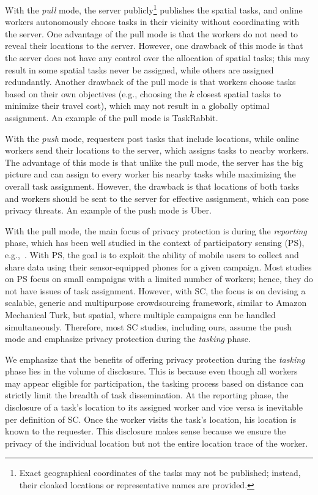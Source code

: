 \documentclass{USC-Thesis}
\numberwithin{equation}{chapter}
\begin{document}
With the \emph{pull} mode, the server publicly\footnote{Exact geographical coordinates of the tasks may not be published; instead, their cloaked locations or representative names are provided.} publishes the spatial tasks, and online workers autonomously choose tasks in their vicinity without coordinating with the server. One advantage of the pull mode is that the workers do not need to reveal their locations to the server. However, one drawback of this mode is that the server does not have any control over the allocation of spatial tasks; this may result in some spatial tasks never be assigned, while others are assigned redundantly. Another drawback of the pull mode is that workers choose tasks based on their own objectives (e.g., choosing the $k$ closest spatial tasks to minimize their travel cost), which may not result in a globally optimal assignment. An example of the pull mode is TaskRabbit.

With the \emph{push} mode, requesters post tasks that include locations, while online workers send their locations to the server, which assigns tasks to nearby workers. The advantage of this mode is that unlike the pull mode, the server has the big picture and can assign to every worker his nearby tasks while maximizing the overall task assignment. However, the drawback is that locations of both tasks and workers should be sent to the server for effective assignment, which can pose privacy threats. An example of the push mode is Uber.

With the pull mode, the main focus of privacy protection is during the \emph{reporting} phase, which has been well studied in the context of participatory sensing (PS), e.g.,~\cite{Shin2011,kazemi2011privacy,Vu2012,Boutsis2013,Zhang2016}. With PS, the goal is to exploit the ability of mobile users to collect and share data using their sensor-equipped phones for a given campaign. Most studies on PS focus on small campaigns with a limited number of workers; hence, they do not have issues of task assignment. However, with SC, the focus is on devising a scalable, generic and multipurpose crowdsourcing framework, similar to Amazon Mechanical Turk, but spatial, where multiple campaigns can be handled simultaneously. Therefore, most SC studies, including ours, assume the push mode and emphasize privacy protection during the \emph{tasking} phase.

We emphasize that the benefits of offering privacy protection during the \emph{tasking} phase lies in the volume of disclosure. This is because even though all workers may appear eligible for participation, the tasking process based on distance can strictly limit the breadth of task dissemination. At the reporting phase, the disclosure of a task's location to its assigned worker and vice versa is inevitable per definition of SC. Once the worker visits the task's location, his location is known to the requester. This disclosure makes sense because we ensure the privacy of the individual location but not the entire location trace of the worker.
\end{document}
